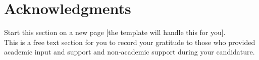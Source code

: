 



\clearpage
\section*{Acknowledgments}

\begin{instructional}
    Start this section on a new page [the template will handle this for you].\\
    
    \noindent
    This is a free text section for you to record your gratitude to those who provided academic input and support and non-academic support during your candidature.
\end{instructional}





